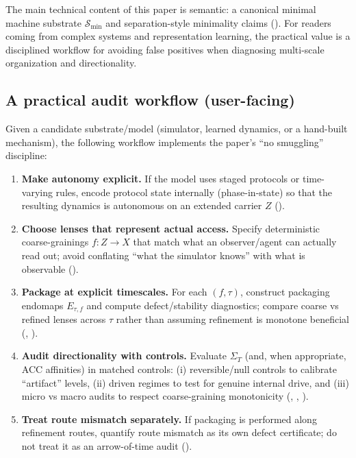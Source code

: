 \documentclass[11pt]{article}
\theoremstyle{definition}
\theoremstyle{remark}
\begin{document}
The main technical content of this paper is semantic: a canonical minimal machine substrate $\mathcal S_{\min}$ and separation-style minimality claims ().
For readers coming from complex systems and representation learning, the practical value is a disciplined workflow for avoiding false positives when diagnosing multi-scale organization and directionality.

\subsection{A practical audit workflow (user-facing)}

Given a candidate substrate/model (simulator, learned dynamics, or a hand-built mechanism), the following workflow implements the paper's ``no smuggling'' discipline:

\begin{enumerate}[leftmargin=*, itemsep=0.35em]
  \item \textbf{Make autonomy explicit.} If the model uses staged protocols or time-varying rules, encode protocol state internally (phase-in-state) so that the resulting dynamics is autonomous on an extended carrier $Z$ ().
  \item \textbf{Choose lenses that represent actual access.} Specify deterministic coarse-grainings $f:Z\to X$ that match what an observer/agent can actually read out; avoid conflating ``what the simulator knows'' with what is observable ().
  \item \textbf{Package at explicit timescales.} For each $(f,\tau)$, construct packaging endomaps $E_{\tau,f}$ and compute defect/stability diagnostics; compare coarse vs refined lenses across $\tau$ rather than assuming refinement is monotone beneficial (, ).
  \item \textbf{Audit directionality with controls.} Evaluate $\Sigma_T$ (and, when appropriate, ACC affinities) in matched controls:
    (i) reversible/null controls to calibrate ``artifact'' levels,
    (ii) driven regimes to test for genuine internal drive,
    and (iii) micro vs macro audits to respect coarse-graining monotonicity (, , ).
  \item \textbf{Treat route mismatch separately.} If packaging is performed along refinement routes, quantify route mismatch as its own defect certificate; do not treat it as an arrow-of-time audit ().
\end{enumerate}
\end{document}
